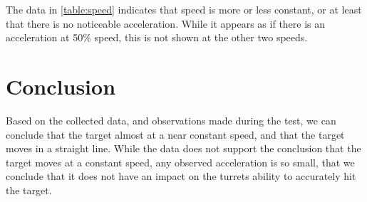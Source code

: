 The data in \autoref{table:speed} indicates that speed is more or less constant,
or at least that there is no noticeable acceleration. While it appears as if
there is an acceleration at 50\% speed, this is not shown at the other two speeds.

\section{Conclusion}
Based on the collected data, and observations made during the test, we can
conclude that the target almost at a near constant speed, and that the target
moves in a straight line. While the data does not support the conclusion that
the target moves at a constant speed, any observed acceleration is so small,
that we conclude that it does not have an impact on the turrets ability to
accurately hit the target.


